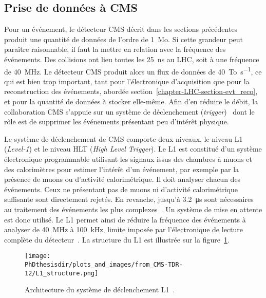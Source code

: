 \subsection{Prise de données à CMS}\label{chapter-LHC-section-CMS-subsec-data_taking}
Pour un événement, le détecteur CMS décrit dans les sections précédentes produit une quantité de données de l'ordre de \SI{1}{\mega o}.
Si cette grandeur peut paraître raisonnable, il faut la mettre en relation avec la fréquence des événements.
Des collisions ont lieu toutes les \SI{25}{\nano\second} au LHC, soit à une fréquence de \SI{40}{\mega\hertz}.
Le détecteur CMS produit alors un flux de données de \SI{40}{\tera o.\second^{-1}}, ce qui est bien trop important, tant pour l'électronique d'acquisition que pour la reconstruction des événements, abordée section~\ref{chapter-LHC-section-evt_reco}, et pour la quantité de données à stocker elle-même.
Afin d'en réduire le débit, la collaboration CMS s'appuie sur un système de déclenchement (\emph{trigger})~\cite{cms_paper,CERN-LHCC-2000-038,CERN-LHCC-2002-026,CMS-TRG-12-001,CMS-TDR-12} dont le rôle est de supprimer les événements présentant peu d'intérêt physique.
\par Le système de déclenchement de CMS comporte deux niveaux, le niveau \og L1 \fg{} (\emph{Level-1}) et le niveau \og HLT \fg{} (\emph{High Level Trigger}).
Le L1 est constitué d'un système électronique programmable utilisant les signaux issus des chambres à muons et des calorimètres pour estimer l'intérêt d'un événement, par exemple par la présence de muons ou d'activité calorimétrique.
Il doit analyser chacun des événements.
Ceux ne présentant pas de muons ni d'activité calorimétrique suffisante sont directement rejetés.
En revanche, jusqu'à \SI{3.2}{\micro\second} sont nécessaires au traitement des événements les plus complexes~\cite{cms_paper}.
Un système de mise en attente est donc utilisé.
Le L1 permet ainsi de réduire la fréquence des événements à analyser de \SI{40}{\mega\hertz} à \SI{100}{\kilo\hertz}, limite imposée par l'électronique de lecture complète du détecteur~\cite{CMS-TRG-12-001}.
La structure du L1 est illustrée sur la figure~\ref{fig-chapter-LHC-section-CMS-subsec-data_taking-cms_paper-fig_8-1}.
\begin{figure}[h]
\centering
\texttt{[image: \\PhDthesisdir/plots\_and\_images/from\_CMS-TDR-12/L1\_structure.png]}
\caption[Architecture du système de déclenchement L1.]{Architecture du système de déclenchement L1~\cite{CMS-TDR-12}.}
\label{fig-chapter-LHC-section-CMS-subsec-data_taking-cms_paper-fig_8-1}
\end{figure}
